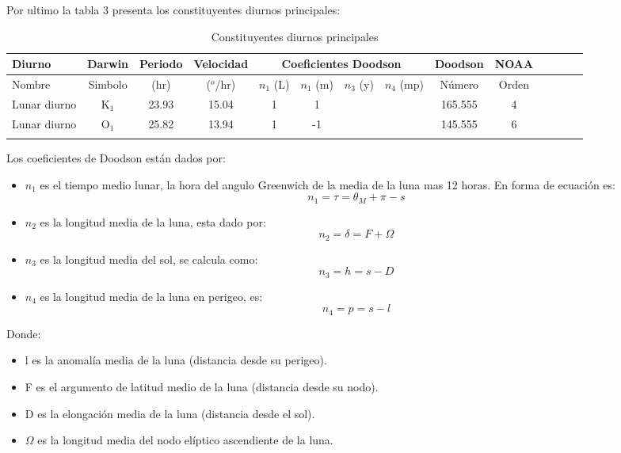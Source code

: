 \documentclass[12pt,letterpaper]{article}
\begin{document}
Por ultimo la tabla 3 presenta los constituyentes diurnos principales\cite{a}:
\begin{center}
	\begin{longtable}{|p{2.7cm}|c|c|c|c|c|c|c|c|c|c|c|c|c}
  	\hline
Diurno & Darwin & Periodo & Velocidad & \multicolumn{4}{c}{Coeficientes Doodson} & Doodson &  NOAA \\
\hline
Nombre & Simbolo & (hr) & ($^o$/hr) & $n_{1}$ (L) & $n_{1}$ (m) &	$n_{3}$ (y) &	$n_{4}$ (mp) & Número  & Orden\\
\hline
Lunar diurno & 	K$_1$ & 	23.93 & 	15.04 & 	1 &	1 & & & 165.555 & 4\\
Lunar diurno &	O$_1$ &	25.82 & 	13.94 &	1 &	-1 & & & 145.555 & 6 \\
    \hline
\caption{Constituyentes diurnos principales}  
\end{longtable}
\end{center}

Los coeficientes de Doodson están dados por\cite{e}:

\begin{itemize}
\item $n_1$ es el tiempo medio lunar, la hora del angulo Greenwich de la media de la luna mas 12 horas. En forma de ecuación es:
\begin{equation}
n_{1} = \tau = \theta_{M} + \pi - s
\end{equation}
\item $n_2$ es la longitud media de la luna, esta dado por:
\begin{equation}
n_{2} = \delta = F + \Omega
\end{equation}
\item $n_3$ es la longitud media del sol, se calcula como: 
\begin{equation}
n_{3} = h = s-D
\end{equation}
\item $n_4$ es la longitud media de la luna en perigeo, es:
\begin{equation}
n_{4} = p = s - l
\end{equation}
\end{itemize}

Donde\cite{e}:
\begin{itemize}
\item l es la anomalía media de la luna (distancia desde su perigeo).
\item F es el argumento de latitud medio de la luna (distancia desde su nodo).
\item D es la elongación media de la luna (distancia desde el sol).
\item $\Omega$ es la longitud media del nodo elíptico ascendiente de la luna.
\end{itemize}
\end{document}
